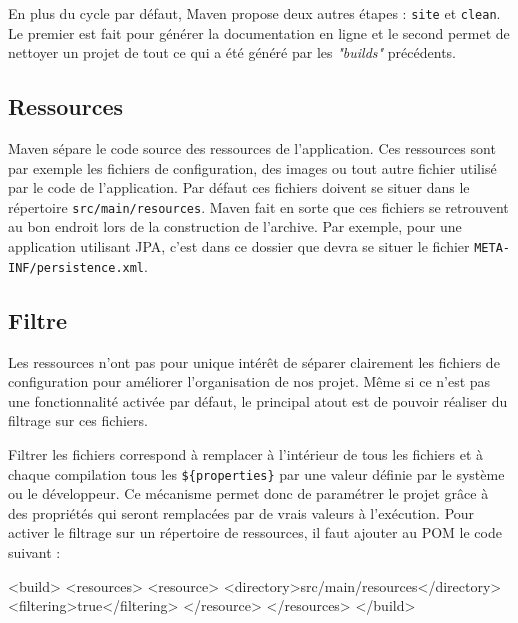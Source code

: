 \documentclass[a4paper,11pt]{article}
\begin{document}
En plus du cycle par défaut, Maven propose deux autres étapes : \texttt{site} et \texttt{clean}. Le premier est 
fait pour générer la documentation en ligne et le second permet de nettoyer un projet de tout ce qui a été généré par les 
\emph{"builds"} précédents.

\subsection{Ressources}
Maven sépare le code source des ressources de l'application. Ces ressources sont par exemple les fichiers de configuration, 
des images ou tout autre fichier utilisé par le code de l'application. Par défaut ces fichiers doivent se situer dans le 
répertoire \texttt{src/main/resources}. Maven fait en sorte que ces fichiers se retrouvent au bon endroit lors de la 
construction de l'archive. Par exemple, pour une application utilisant JPA, c'est dans ce dossier que devra se situer 
le fichier \texttt{META-INF/persistence.xml}.

\subsection{Filtre}
Les ressources n'ont pas pour unique intérêt de séparer clairement les fichiers de configuration pour améliorer 
l'organisation de nos projet. Même si ce n'est pas une fonctionnalité activée par défaut, le principal atout est 
de pouvoir réaliser du filtrage sur ces fichiers. 

Filtrer les fichiers correspond à remplacer à l'intérieur de tous les fichiers et à chaque compilation tous les 
\texttt{\$\{properties\}} par une valeur définie par le système ou le développeur. Ce mécanisme permet donc de paramétrer 
le projet grâce à des propriétés qui seront remplacées par de vrais valeurs à l'exécution. Pour activer le filtrage sur un 
répertoire de ressources, il faut ajouter au POM le code suivant : 
\begin{code_xml}
<build>
  <resources>
    <resource>
      <directory>src/main/resources</directory>
      <filtering>true</filtering>
    </resource>
  </resources>
</build>
\end{code_xml}
\end{document}
